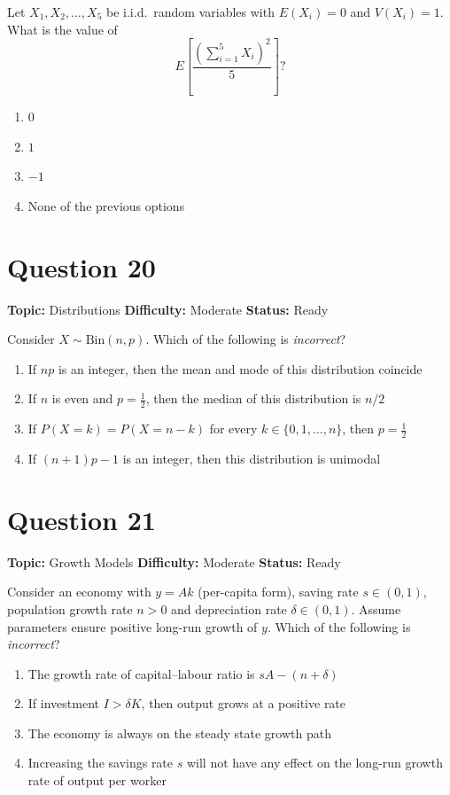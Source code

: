 \documentclass[11pt]{article}
\begin{document}
Let $X_1,X_2,\dots,X_5$ be i.i.d.\ random variables with $E(X_i)=0$ and $V(X_i)=1$. What is the value of
\[
E\!\left[\frac{(\sum_{i=1}^{5} X_i)^{2}}{5}\right]?
\]
\begin{enumerate}[label=(\Alph*)]
\item $0$
\item $1$
\item $-1$
\item None of the previous options
\end{enumerate}

\newpage

\section*{Question 20}


\noindent\textbf{Topic:} Distributions \quad \textbf{Difficulty:} Moderate \quad \textbf{Status:} Ready



Consider $X\sim\text{Bin}(n,p)$. Which of the following is \emph{incorrect}?
\begin{enumerate}[label=(\Alph*)]
\item If $np$ is an integer, then the mean and mode of this distribution coincide
\item If $n$ is even and $p=\tfrac12$, then the median of this distribution is $n/2$
\item If $P(X=k)=P(X=n-k)$ for every $k\in\{0,1,\dots,n\}$, then $p=\tfrac12$
\item If $(n+1)p-1$ is an integer, then this distribution is unimodal
\end{enumerate}

\newpage

\section*{Question 21}


\noindent\textbf{Topic:} Growth Models \quad \textbf{Difficulty:} Moderate \quad \textbf{Status:} Ready



Consider an economy with $y=Ak$ (per-capita form), saving rate $s\in(0,1)$, population growth rate $n>0$ and depreciation rate $\delta\in(0,1)$. Assume parameters ensure positive long-run growth of $y$. Which of the following is \emph{incorrect}?
\begin{enumerate}[label=(\Alph*)]
\item The growth rate of capital--labour ratio is $sA-(n+\delta)$
\item If investment $I>\delta K$, then output grows at a positive rate
\item The economy is always on the steady state growth path
\item Increasing the savings rate $s$ will not have any effect on the long-run growth rate of output per worker
\end{enumerate}
\end{document}
